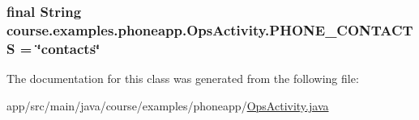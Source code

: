 \subsubsection[{P\+H\+O\+N\+E\+\_\+\+C\+O\+N\+T\+A\+C\+T\+S}]{\setlength{\rightskip}{0pt plus 5cm}final String course.\+examples.\+phoneapp.\+Ops\+Activity.\+P\+H\+O\+N\+E\+\_\+\+C\+O\+N\+T\+A\+C\+T\+S = \char`\"{}contacts\char`\"{}\hspace{0.3cm}{\ttfamily [static]}}\label{classcourse_1_1examples_1_1phoneapp_1_1_ops_activity_a6bbe27893d347a4f66c9bac0e2dcc80b}


The documentation for this class was generated from the following file\+:\begin{DoxyCompactItemize}
\item 
app/src/main/java/course/examples/phoneapp/\hyperlink{_ops_activity_8java}{Ops\+Activity.\+java}\end{DoxyCompactItemize}
